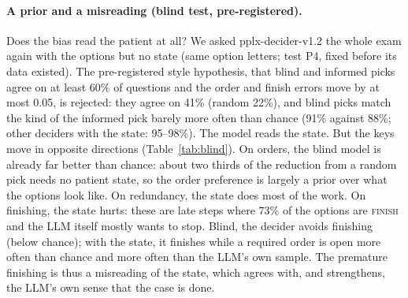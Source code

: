 \documentclass[11pt]{article}
\begin{document}
\paragraph{A prior and a misreading (blind test, pre-registered).} Does the bias read the patient at all? We asked
pplx-decider-v1.2 the whole exam again with the options but no state (same option letters; test P4, fixed before its
data existed). The pre-registered style hypothesis, that blind and informed picks agree on at least 60\% of questions
and the order and finish errors move by at most 0.05, is rejected: they agree on 41\% (random 22\%), and blind picks
match the kind of the informed pick barely more often than chance (91\% against 88\%; other deciders with the state:
95--98\%). The model reads the state. But the keys move in opposite directions (Table~\ref{tab:blind}). On orders,
the blind model is already far better than chance: about two thirds of the reduction from a random pick needs no
patient state, so the order preference is largely a prior over what the options look like. On redundancy, the state
does most of the work. On finishing, the state hurts: these are late steps where 73\% of the options are
\textsc{finish} and the LLM itself mostly wants to stop. Blind, the decider avoids finishing (below chance); with the
state, it finishes while a required order is open more often than chance and more often than the LLM's own sample.
The premature finishing is thus a misreading of the state, which agrees with, and strengthens, the LLM's own sense
that the case is done.

\begin{table}[t]
\centering\small
{}
\caption{\textbf{Blind test (P4), pplx-decider-v1.2.} Key errors of a random option, of the decider without the patient
state (options only) and with it; differences with task-bootstrap 95\% CIs. The LLM's own sample: 0.55, 0.28, 0.80.}
\label{tab:blind}
\end{table}
\end{document}
